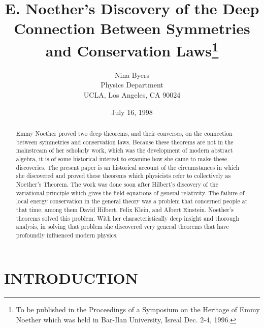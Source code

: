 \documentclass[12pt]{article}
\begin{document}
\title{E. Noether's Discovery of the Deep Connection Between
Symmetries and
                   Conservation Laws\footnote{To be published in
the Proceedings of a
Symposium on the Heritage of Emmy Noether which was held in 
Bar-Ilan University, Isreal Dec. 2-4,
1996.}}


\author{Nina Byers \\Physics
Department\\ UCLA, Los Angeles, CA 90024}
 \date{July 16, 1998}
 \maketitle

\begin{abstract} 
Emmy Noether proved two deep theorems, and their converses, on
 the connection between symmetries and conservation laws. Because these
 theorems are not in the mainstream of her scholarly work, 
  which was the development of modern
 abstract algebra,  it is of some historical interest to examine how
 she came to make these discoveries.  The present paper is an historical account of the
 circumstances in which she  discovered and proved  these theorems which
 physicists refer to collectively as Noether's Theorem.  The work was done 
 soon after  Hilbert's discovery of the variational principle which
 gives the field equations of general relativity.  The failure of local energy
 conservation in the general theory was a problem that concerned people at that
 time, among them David Hilbert, Felix Klein, and Albert Einstein.  Noether's
 theorems solved this problem.  With her characteristically deep insight and
 thorough analysis, in solving that problem she discovered very general theorems
 that have profoundly influenced modern physics. 
 \end{abstract}





\section{INTRODUCTION} 
\end{document}
